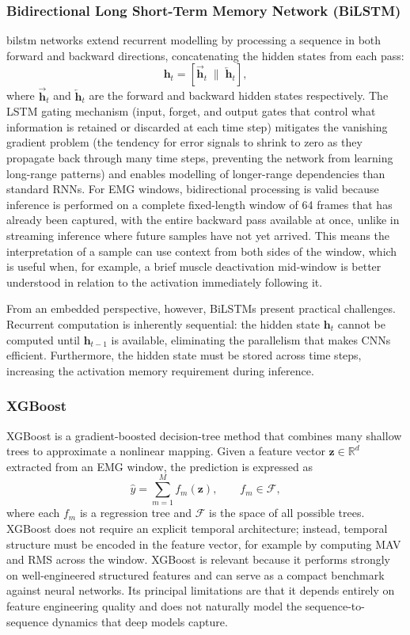 \documentclass[11pt]{article}
\begin{document}
\subsubsection{Bidirectional Long Short-Term Memory Network (BiLSTM)}
\Gls{bilstm} networks extend recurrent modelling by processing a sequence in both forward and backward directions, concatenating the hidden states from each pass:
\begin{equation}
\mathbf{h}_t = \left[\overrightarrow{\mathbf{h}}_t \; \| \; \overleftarrow{\mathbf{h}}_t\right],
\end{equation}
where $\overrightarrow{\mathbf{h}}_t$ and $\overleftarrow{\mathbf{h}}_t$ are the forward and backward hidden states respectively. The LSTM gating mechanism (input, forget, and output gates that control what information is retained or discarded at each time step) mitigates the vanishing gradient problem (the tendency for error signals to shrink to zero as they propagate back through many time steps, preventing the network from learning long-range patterns) and enables modelling of longer-range dependencies than standard RNNs. For EMG windows, bidirectional processing is valid because inference is performed on a complete fixed-length window of 64 frames that has already been captured, with the entire backward pass available at once, unlike in streaming inference where future samples have not yet arrived. This means the interpretation of a sample can use context from both sides of the window, which is useful when, for example, a brief muscle deactivation mid-window is better understood in relation to the activation immediately following it.

From an embedded perspective, however, BiLSTMs present practical challenges. Recurrent computation is inherently sequential: the hidden state $\mathbf{h}_t$ cannot be computed until $\mathbf{h}_{t-1}$ is available, eliminating the parallelism that makes CNNs efficient. Furthermore, the hidden state must be stored across time steps, increasing the activation memory requirement during inference. 

\subsubsection{XGBoost}
XGBoost is a gradient-boosted decision-tree method that combines many shallow trees to approximate a nonlinear mapping. Given a feature vector $\mathbf{z} \in \mathbb{R}^{d}$ extracted from an EMG window, the prediction is expressed as
\begin{equation}
\hat{y} = \sum_{m=1}^{M} f_m(\mathbf{z}), \qquad f_m \in \mathcal{F},
\end{equation}
where each $f_m$ is a regression tree and $\mathcal{F}$ is the space of all possible trees. XGBoost does not require an explicit temporal architecture; instead, temporal structure must be encoded in the feature vector, for example by computing MAV and RMS across the window. XGBoost is relevant because it performs strongly on well-engineered structured features and can serve as a compact benchmark against neural networks. Its principal limitations are that it depends entirely on feature engineering quality and does not naturally model the sequence-to-sequence dynamics that deep models capture.
\end{document}
